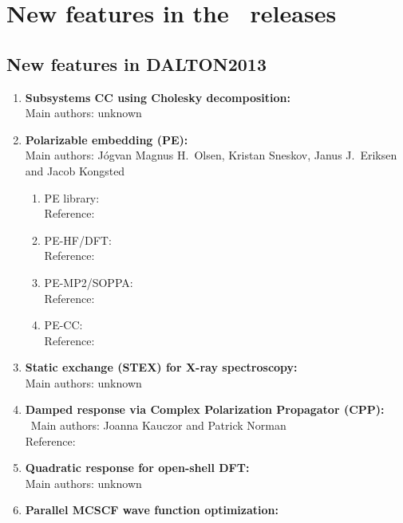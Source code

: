\chapter{New features in the \dalton\ releases}

\section{New features in DALTON2013}

\begin{enumerate}
\item{\bf  Subsystems CC using Cholesky decomposition:}  \\
Main authors: unknown \\
\item{\bf  Polarizable embedding (PE):}  \\
Main authors: J\'{o}gvan Magnus H.\ Olsen, Kristan Sneskov, Janus J.\ Eriksen and Jacob Kongsted
\begin{enumerate}
  \item{PE library:}  \\
   Reference: 
   \cite{pelib2012}
  \item{PE-HF/DFT:}  \\
   Reference: 
   \cite{pescf}
  \item{PE-MP2/SOPPA:}  \\
   Reference: 
   \cite{pesoppa}
  \item{PE-CC:}  \\
   Reference: 
   \cite{pecc}
\end{enumerate}
\item{\bf  Static exchange (STEX) for X-ray spectroscopy:}  \\
Main authors: unknown \\
\item{\bf  Damped response via Complex Polarization Propagator (CPP):}  \\\
Main authors: Joanna Kauczor and Patrick Norman \\
Reference: 
\cite{kauczor:2011} \\
\item{\bf  Quadratic response for open-shell DFT:}  \\
Main authors: unknown \\
\item{\bf  Parallel MCSCF wave function optimization:}  \\\

\end{enumerate}
